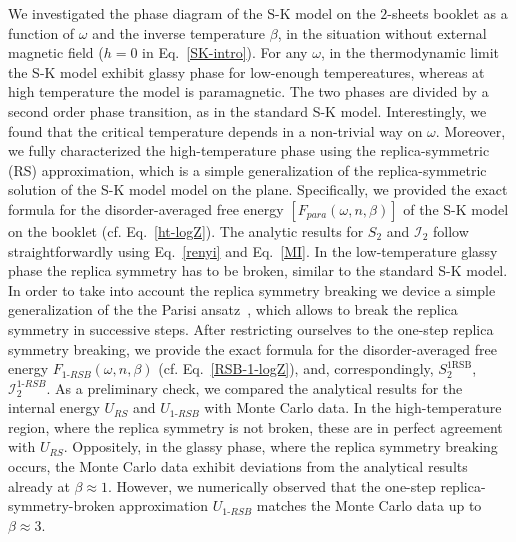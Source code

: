 \documentclass[twocolumn,superscriptaddress,prb,10pt]{revtex4-1}
\begin{document}
We investigated the phase diagram of the S-K model on the $2$-sheets booklet as a function 
of $\omega$ and the inverse temperature $\beta$, in the situation without external 
magnetic field ($h=0$ in Eq.~\eqref{SK-intro}). For any $\omega$, in the 
thermodynamic limit the S-K model exhibit glassy phase for low-enough tempereatures, 
whereas at high temperature the model is paramagnetic. The two phases are divided 
by a second order phase transition, as in the standard S-K model. 
Interestingly, we found that the critical temperature depends in a non-trivial 
way on $\omega$. Moreover, we fully characterized the high-temperature phase 
using the replica-symmetric (RS) approximation, which is a simple generalization 
of the replica-symmetric solution of the S-K model model on the plane. Specifically, 
we provided the exact formula for the disorder-averaged free energy $[F_{para}(\omega,n,
\beta)]$ of the S-K model on the booklet (cf. Eq.~\eqref{ht-logZ}). The analytic results 
for $S_2$ and ${\mathcal I}_2$ follow straightforwardly using Eq.~\eqref{renyi} and 
Eq.~\eqref{MI}. In the low-temperature glassy phase the replica symmetry has to be 
broken, similar to the standard S-K model. In order to take into account the 
replica symmetry breaking we device a simple generalization of the the Parisi 
ansatz~\cite{parisi-1980}, which allows to break the replica symmetry in successive 
steps. After restricting ourselves to the one-step replica symmetry breaking, we 
provide the exact formula for the disorder-averaged free energy $F_{1\textrm{-}RSB}
(\omega,n,\beta)$ (cf. Eq.~\eqref{RSB-1-logZ}), and, correspondingly, $S_2^{1\textrm{RSB}}$, 
${\mathcal I}_2^{1\textrm{-}RSB}$. As a preliminary check, we compared the analytical 
results for the internal energy $U_{RS}$ and $U_{1\textrm{-}RSB}$ with Monte Carlo data. 
In the high-temperature region, where the replica symmetry is not broken, these are 
in perfect agreement with $U_{RS}$. Oppositely, in the glassy phase, where the replica 
symmetry breaking occurs, the Monte Carlo data exhibit deviations from the analytical 
results already at $\beta\approx 1$. However, we numerically observed that the one-step 
replica-symmetry-broken approximation $U_{1\textrm{-}RSB}$ matches the Monte Carlo 
data up to $\beta\approx 3$. 
\end{document}
